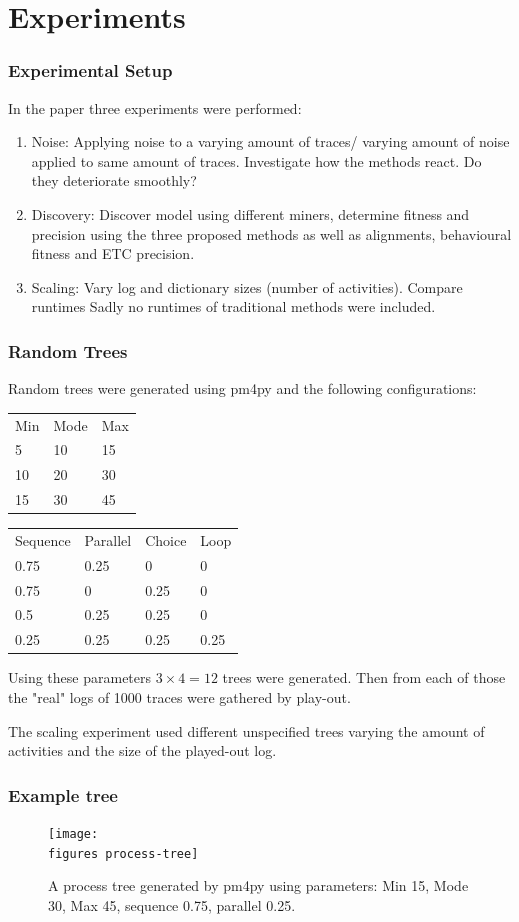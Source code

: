 \documentclass{beamer}
\newcommand{\figures}{../figures/}
\begin{document}
	\section{Experiments}
	\begin{frame}
		\frametitle{Experimental Setup}
		In the paper three experiments were performed:
		\begin{enumerate}
			\item Noise: Applying noise to a varying amount of traces/ varying amount of noise applied to same amount of traces. Investigate how the methods react. Do they deteriorate smoothly?
			\item Discovery: Discover model using different miners, determine fitness and precision using the three proposed methods as well as alignments, behavioural fitness and ETC precision.
			\item Scaling: Vary log and dictionary sizes (number of activities). Compare runtimes \alert{Sadly no runtimes of traditional methods were included.}
		\end{enumerate}
	\end{frame}
	\begin{frame}
		\frametitle{Random Trees}
		Random trees were generated using pm4py and the following configurations:
		
		\begin{center}
		\begin{tabular}{lll}
			Min & Mode & Max \\
			5 & 10 & 15 \\
			10 & 20 & 30 \\
			15 & 30 & 45 \\
		\end{tabular}
	\hspace{40pt}
		\begin{tabular}{llll}
			Sequence & Parallel & Choice & Loop \\
			0.75 & 0.25 & 0 & 0 \\
			0.75 & 0 & 0.25 & 0 \\
			0.5 & 0.25 & 0.25 & 0 \\
			0.25 & 0.25 & 0.25 & 0.25 \\
		\end{tabular}
	\end{center}

		Using these parameters $3\times4=12$ trees were generated.
		Then from each of those the "real" logs of 1000 traces were gathered by play-out.
		
		The scaling experiment used different unspecified trees varying the amount of activities and the size of the played-out log.
	\end{frame}
	\begin{frame}
		\frametitle{Example tree}
		\begin{figure}
			\texttt{[image: \\figures process-tree]}
			\caption{A process tree generated by pm4py using parameters: Min 15, Mode 30, Max 45, sequence 0.75, parallel 0.25. }
			\label{fig:process-tree}
		\end{figure}
	\end{frame}
	
\end{document}
